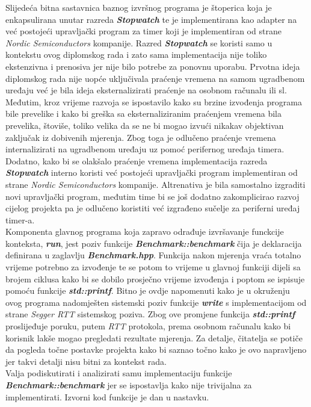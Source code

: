 Slijedeća bitna sastavnica baznog izvršnog programa je štoperica koja je enkapsulirana unutar razreda \textbf{\textit{Stopwatch}} te je implementirana kao adapter na već postojeći upravljački program za timer koji je implementiran od strane \textit{Nordic Semiconductors} kompanije. Razred \textbf{\textit{Stopwatch}} se koristi samo u kontekstu ovog diplomskog rada i zato sama implementacija nije toliko ekstenzivna i prenosiva jer nije bilo potrebe za ponovnu uporabu. Prvotna ideja diplomskog rada nije uopće uključivala praćenje vremena na samom ugradbenom uređaju već je bila ideja eksternalizirati praćenje na osobnom računalu ili sl. Međutim, kroz vrijeme razvoja se ispostavilo kako su brzine izvođenja programa bile prevelike i kako bi greška sa eksternaliziranim praćenjem vremena bila prevelika, štoviše, toliko velika da se ne bi mogao izvući nikakav objektivan zaključak iz dobivenih mjerenja. Zbog toga je odlučeno praćenje vremena internalizirati na ugradbenom uređaju uz pomoć perifernog uređaja timera. Dodatno, kako bi se olakšalo praćenje vremena implementacija razreda \textbf{\textit{Stopwatch}} interno koristi već postojeći upravljački program implementiran od strane \textit{Nordic Semiconductors} kompanije. Altrenativa je bila samostalno izgraditi novi upravljački program, međutim time bi se još dodatno zakomplicirao razvoj cijelog projekta pa je odlučeno koristiti već izgrađeno sučelje za periferni uređaj timer-a.\\
Komponenta glavnog programa koja zapravo odrađuje izvršavanje funckcije konteksta, \textbf{\textit{run}}, jest poziv funkcije \textbf{\textit{Benchmark::benchmark}} čija je deklaracija definirana u zaglavlju \textbf{\textit{Benchmark.hpp}}. Funkcija nakon mjerenja vraća totalno vrijeme potrebno za izvođenje te se potom to vrijeme u glavnoj funkciji dijeli sa brojem ciklusa kako bi se dobilo prosječno vrijeme izvođenja i poptom se ispisuje pomoću funkcije \textbf{\textit{std::printf}}. Bitno je ovdje napomenuti kako je u okruženju ovog programa nadomješten sistemski poziv funkcije \textbf{\textit{write}} s implementacijom od strane \textit{Segger RTT} sistemskog poziva. Zbog ove promjene funkcija \textbf{\textit{std::printf}} proslijeđuje poruku, putem \textit{RTT} protokola, prema osobnom računalu kako bi korisnik lakše mogao pregledati rezultate mjerenja. Za detalje, čitatelja se potiče da pogleda točne postavke projekta kako bi saznao točno kako je ovo napravljeno jer takvi detalji nisu bitni za kontekst rada. \\
Valja podiskutirati i analizirati samu implementaciju funkcije \textbf{\textit{Benchmark::benchmark}} jer se ispostavlja kako nije trivijalna za implementirati. Izvorni kod funkcije je dan u nastavku.
